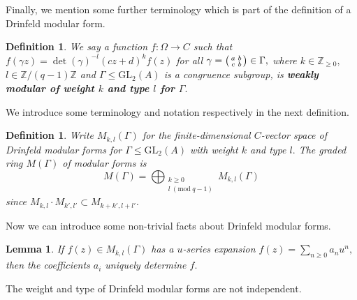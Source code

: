 \documentclass[11pt]{amsart}
\newtheorem{lemma}[theorem]{Lemma}
\newtheorem{definition}[theorem]{Definition}
\theoremstyle{definition}
\newenvironment{psmallmatrix}
{\left(\begin{smallmatrix}}
	{\end{smallmatrix}\right)}
\numberwithin{equation}{section}
\newcommand{\GL}{\mathrm{GL}} 	%
\newcommand{\bbZ}{\mathbb{Z}}		%
\newcommand{\Mod}[1]{\ (\mathrm{mod}\ #1)}
\begin{document}
		Finally, we mention some further terminology which is part of the definition of a Drinfeld modular form.
		\begin{definition}
			We say a function $f:\Omega\to C$ such that $f(\gamma z)=\det(\gamma)^{-l}(cz+d)^kf(z)$ for all $\displaystyle{\gamma=\begin{psmallmatrix}a&b\\c&b\end{psmallmatrix}\in \Gamma},$ where $k\in \bbZ_{\geq 0},$ $l\in \bbZ/(q-1)\bbZ$ and $\Gamma\leq \GL_2(A)$ is a congruence subgroup, is \textbf{weakly modular of weight $k$ and type $l$ for $\Gamma.$}
		\end{definition}
		
		We introduce some terminology and notation respectively in the next definition.
		
		\begin{definition}
			Write $M_{k,l}(\Gamma)$ for the finite-dimensional $C$-vector space of Drinfeld modular forms for $\Gamma\leq \GL_2(A)$ with weight $k$ and type $l.$ The graded ring $M(\Gamma)$ of modular forms is 
			\[M(\Gamma)=\bigoplus_{\substack{k\geq 0\\l\Mod{q-1}}} M_{k,l}(\Gamma)\]
			since $M_{k,l}\cdot M_{k',l'}\subset M_{k+k',l+l'}.$
		\end{definition}
		
		Now we can introduce some non-trivial facts about Drinfeld modular forms.
		
		\begin{lemma}\cite[Remark $5.8.\mathrm{iii}$]{Gekeler-Coeff}\label{l: u-series coeffs determine form}
			If $f(z)\in M_{k,l}(\Gamma)$ has a $u$-series expansion $f(z)=\sum_{n\geq 0}a_nu^n,$ then the coefficients $a_i$ uniquely determine $f.$
		\end{lemma}
		
		The weight and type of Drinfeld modular forms are not independent. 
		
\end{document}
